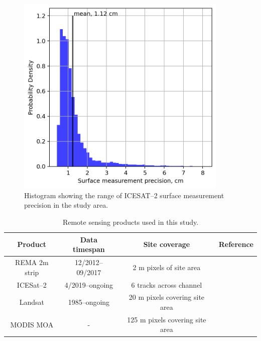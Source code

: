 \begin{figure}[!ht]
\centering
\includegraphics[width=0.9\textwidth]{chapters/2/icesat2_histogram.png}
\caption[ICESAT--2 surface measurement precision]{Histogram showing the range of ICESAT--2 surface measurement precision in the study area.}
\label{fig:icesat2_histogram}
\end{figure}



% 




\begin{table}
\centering
\begin{tabular}{ |c|c c c| } 
 \hline
 Product & Data timespan & Site coverage &  Reference \\ 
 \hline
 REMA 2m strip &  12/2012--09/2017 & 2 m pixels of site area 
 & \cite{howat2019reference}\\ 
 ICESat--2 &  4/2019--ongoing &  6 tracks across channel  & \cite{smith2021v3}\\
 Landsat &  1985--ongoing & 20 m pixels covering site area  & \cite{RoyLandsat8Scienceproduct2014}\\ 
 MODIS MOA & - & 125 m pixels covering site area  & \cite{haran2014modis}\\
 \hline
\end{tabular}
\label{tab:remote_table}
\caption{Remote sensing products used in this study.}
\end{table}


